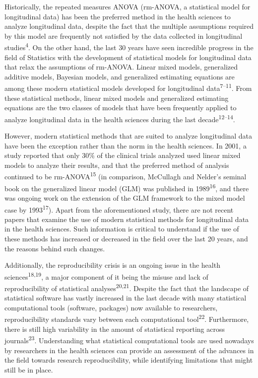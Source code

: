 \documentclass[
]{article}
\begin{document}
Historically, the repeated measures ANOVA (rm-ANOVA, a statistical model
for longitudinal data) has been the preferred method in the health
sciences to analyze longitudinal data, despite the fact that the
multiple assumptions required by this model are frequently not satisfied
by the data collected in longitudinal studies\textsuperscript{4}. On the
other hand, the last 30 years have seen incredible progress in the field
of Statistics with the development of statistical models for
longitudinal data that relax the assumptions of rm-ANOVA. Linear mixed
models, generalized additive models, Bayesian models, and generalized
estimating equations are among these modern statistical models developed
for longitudinal data\textsuperscript{7--11}. From these statistical
methods, linear mixed models and generalized estimating equations are
the two classes of models that have been frequently applied to analyze
longitudinal data in the health sciences during the last
decade\textsuperscript{12--14}.

However, modern statistical methods that are suited to analyze
longitudinal data have been the exception rather than the norm in the
health sciences. In 2001, a study reported that only 30\% of the
clinical trials analyzed used linear mixed models to analyze their
results, and that the preferred method of analysis continued to be
rm-ANOVA\textsuperscript{15} (in comparison, McCullagh and Nelder's
seminal book on the generalized linear model (GLM) was published in
1989\textsuperscript{16}, and there was ongoing work on the extension of
the GLM framework to the mixed model case by 1993\textsuperscript{17}).
Apart from the aforementioned study, there are not recent papers that
examine the use of modern statistical methods for longitudinal data in
the health sciences. Such information is critical to understand if the
use of these methods has increased or decreased in the field over the
last 20 years, and the reasons behind such changes.

Additionally, the reproducibility crisis is an ongoing issue in the
health sciences\textsuperscript{18,19}, a major component of it being
the misuse and lack of reproducibility of statistical
analyses\textsuperscript{20,21}. Despite the fact that the landscape of
statistical software has vastly increased in the last decade with many
statistical computational tools (software, packages) now available to
researchers, reproducibility standards vary between each computational
tool\textsuperscript{22}. Furthermore, there is still high variability
in the amount of statistical reporting across
journals\textsuperscript{23}. Understanding what statistical
computational tools are used nowadays by researchers in the health
sciences can provide an assessment of the advances in the field towards
research reproducibility, while identifying limitations that might still
be in place.
\end{document}

